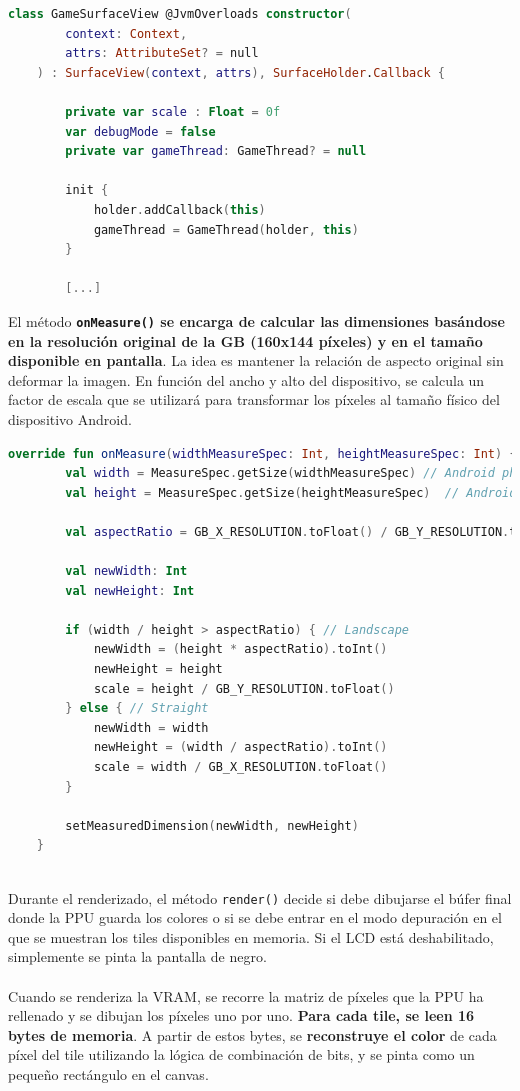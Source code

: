 \begin{lstlisting}[language=Kotlin, caption={Creación del Game Surface View.}, label={code:surfaceview}]
    class GameSurfaceView @JvmOverloads constructor(
        context: Context,
        attrs: AttributeSet? = null
    ) : SurfaceView(context, attrs), SurfaceHolder.Callback {

        private var scale : Float = 0f
        var debugMode = false
        private var gameThread: GameThread? = null

        init {
            holder.addCallback(this)
            gameThread = GameThread(holder, this)
        }

        [...]

\end{lstlisting}

El método \textbf{\texttt{onMeasure()} se encarga de calcular las dimensiones basándose en la resolución original de la GB (160x144 píxeles) y en el tamaño disponible en pantalla}. La idea es mantener la relación de aspecto original sin deformar la imagen. En función del ancho y alto del dispositivo, se calcula un factor de escala que se utilizará para transformar los píxeles al tamaño físico del dispositivo Android.

\begin{lstlisting}[language=Kotlin, caption={Medición y Escalado del Canvas.}, label={code:surfaceonmeasure}]
    override fun onMeasure(widthMeasureSpec: Int, heightMeasureSpec: Int) {
        val width = MeasureSpec.getSize(widthMeasureSpec) // Android phone total width
        val height = MeasureSpec.getSize(heightMeasureSpec)  // Android phone total height

        val aspectRatio = GB_X_RESOLUTION.toFloat() / GB_Y_RESOLUTION.toFloat() // GB Aspect Ratio

        val newWidth: Int
        val newHeight: Int

        if (width / height > aspectRatio) { // Landscape
            newWidth = (height * aspectRatio).toInt()
            newHeight = height
            scale = height / GB_Y_RESOLUTION.toFloat()
        } else { // Straight
            newWidth = width
            newHeight = (width / aspectRatio).toInt()
            scale = width / GB_X_RESOLUTION.toFloat()
        }

        setMeasuredDimension(newWidth, newHeight)
    }
    
\end{lstlisting}

Durante el renderizado, el método \texttt{render()} decide si debe dibujarse el búfer final donde la PPU guarda los colores o si se debe entrar en el modo depuración en el que se muestran los tiles disponibles en memoria. Si el LCD está deshabilitado, simplemente se pinta la pantalla de negro.
\\\\
Cuando se renderiza la VRAM, se recorre la matriz de píxeles que la PPU ha rellenado y se dibujan los píxeles uno por uno. \textbf{Para cada tile, se leen 16 bytes de memoria}. A partir de estos bytes, se \textbf{reconstruye el color} de cada píxel del tile utilizando la lógica de combinación de bits, y se pinta como un pequeño rectángulo en el canvas.

